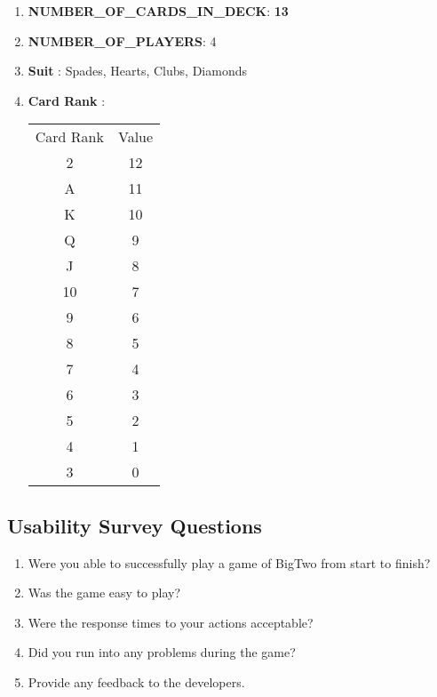 \documentclass[12pt, titlepage]{article}
\begin{document}
\begin{enumerate}
\item \textbf{NUMBER\_OF\_CARDS\_IN\_DECK}: \textbf{13}
\item \textbf{NUMBER\_OF\_PLAYERS}: 4
\item \textbf{Suit} : Spades, Hearts, Clubs, Diamonds
\item \textbf{Card Rank} : 
\begin{tabular}{c|c}
       Card Rank & Value \\
       2  & 12\\
       A & 11\\
       K & 10\\
       Q & 9\\
       J & 8\\
       10 & 7\\
       9 & 6\\
       8 & 5\\
       7 & 4\\
       6 & 3\\
       5 & 2\\
       4 & 1\\
       3 & 0\\
\end{tabular}
\end{enumerate}


\subsection{Usability Survey Questions}

\begin{enumerate}
\item Were you able to successfully play a game of BigTwo from start to finish? 
\item Was the game easy to play?
\item Were the response times to your actions acceptable?
\item Did you run into any problems during the game?
\item Provide any feedback to the developers.
\end{enumerate}
\end{document}
